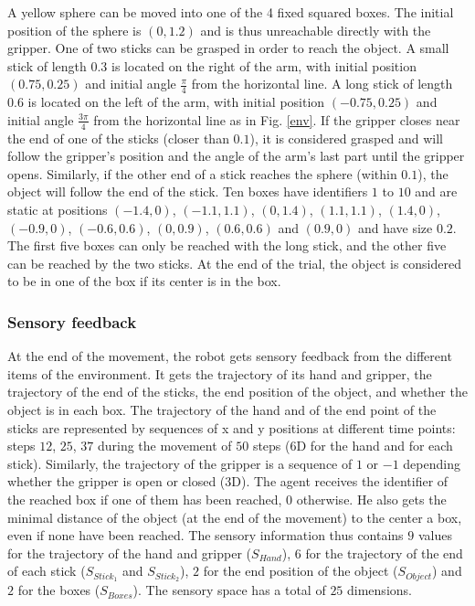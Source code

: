 \documentclass[10pt,letterpaper]{article}
\begin{document}
			A yellow sphere can be moved into one of the 4 fixed squared boxes. 
			The initial position of the sphere is $(0, 1.2)$ and is thus unreachable directly with the gripper.
			One of two sticks can be grasped in order to reach the object.
			A small stick of length $0.3$ is located on the right of the arm, with initial position $(0.75, 0.25)$ and initial angle $\frac{\pi}{4}$ from the horizontal line.
			A long stick of length $0.6$ is located on the left of the arm, with initial position $(-0.75, 0.25)$ and initial angle $\frac{3\pi}{4}$ from the horizontal line as in Fig. \ref{env}.			
			If the gripper closes near the end of one of the sticks (closer than $0.1$), it is considered grasped and will follow the gripper's position and the angle of the arm's last part until the gripper opens.			
			Similarly, if the other end of a stick reaches the sphere (within $0.1$), the object will follow the end of the stick.
			Ten boxes have identifiers $1$ to $10$ and are static at positions $(-1.4, 0)$, $(-1.1, 1.1)$, $(0, 1.4)$, $(1.1, 1.1)$, $(1.4, 0)$, $(-0.9, 0)$, $(-0.6, 0.6)$, $(0, 0.9)$, $(0.6, 0.6)$ and $(0.9, 0)$ and have size $0.2$.
			The first five boxes can only be reached with the long stick, and the other five can be reached by the two sticks.
			At the end of the trial, the object is considered to be in one of the box if its center is in the box.\\
		
		
		\subsubsection{Sensory feedback}
		
			At the end of the movement, the robot gets sensory feedback from the different items of the environment.
			It gets the trajectory of its hand and gripper, the trajectory of the end of the sticks, 
			the end position of the object, and whether the object is in each box.		
			The trajectory of the hand and of the end point of the sticks are represented by sequences of x and y positions at different time points: 
			steps $12$, $25$, $37$ during the movement of $50$ steps ($6$D for the hand and for each stick).
			Similarly, the trajectory of the gripper is a sequence of $1$ or $-1$ depending whether the gripper is open or closed ($3$D).
			The agent receives the identifier of the reached box if one of them has been reached, 0 otherwise. He also gets the minimal distance of the object (at the end of the movement) to the center a box, even if none have been reached.
			The sensory information thus contains $9$ values for the trajectory of the hand and gripper ($S_{Hand}$), $6$ for the trajectory of the end of each stick ($S_{Stick_1}$ and $S_{Stick_2}$), $2$ for the end position of the object ($S_{Object}$) and $2$ for the boxes ($S_{Boxes}$).
			The sensory space has a total of $25$ dimensions.
			
\end{document}
